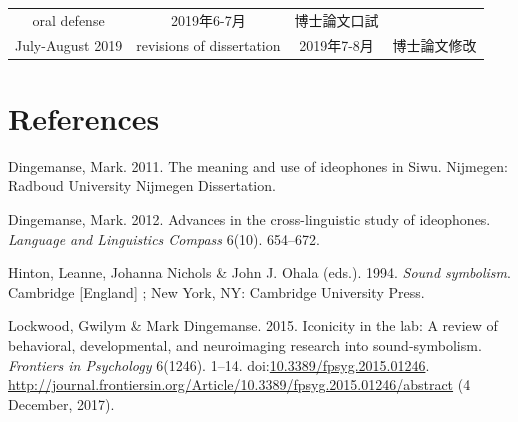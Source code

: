 \documentclass[12pt,]{article}
\theoremstyle{definition}
\theoremstyle{definition}
\theoremstyle{definition}
\theoremstyle{remark}
\begin{document}
\begin{longtable}[]{@{}cccc@{}}
\begin{minipage}[t]{0.26\columnwidth}
oral defense\strut
\end{minipage} & \begin{minipage}[t]{0.18\columnwidth}\centering\strut
2019年6-7月\strut
\end{minipage} & \begin{minipage}[t]{0.24\columnwidth}\centering\strut
博士論文口試\strut
\end{minipage}\tabularnewline
\begin{minipage}[t]{0.20\columnwidth}\centering\strut
July-August 2019\strut
\end{minipage} & \begin{minipage}[t]{0.26\columnwidth}\centering\strut
revisions of dissertation\strut
\end{minipage} & \begin{minipage}[t]{0.18\columnwidth}\centering\strut
2019年7-8月\strut
\end{minipage} & \begin{minipage}[t]{0.24\columnwidth}\centering\strut
博士論文修改\strut
\end{minipage}\tabularnewline
\bottomrule
\end{longtable}

\section{References}\label{references}

\setlength{\parindent}{-0.5in} \setlength{\leftskip}{0.5in}
\setlength{\parskip}{8pt} \noindent

\hypertarget{refs}{}
\hypertarget{ref-Dingemanse2011a}{}
Dingemanse, Mark. 2011. The meaning and use of ideophones in Siwu.
Nijmegen: Radboud University Nijmegen Dissertation.

\hypertarget{ref-Dingemanse2012}{}
Dingemanse, Mark. 2012. Advances in the cross-linguistic study of
ideophones. \emph{Language and Linguistics Compass} 6(10). 654--672.

\hypertarget{ref-Hinton1994}{}
Hinton, Leanne, Johanna Nichols \& John J. Ohala (eds.). 1994.
\emph{Sound symbolism}. Cambridge {[}England{]} ; New York, NY:
Cambridge University Press.

\hypertarget{ref-Lockwood2015a}{}
Lockwood, Gwilym \& Mark Dingemanse. 2015. Iconicity in the lab: A
review of behavioral, developmental, and neuroimaging research into
sound-symbolism. \emph{Frontiers in Psychology} 6(1246). 1--14.
doi:\href{https://doi.org/10.3389/fpsyg.2015.01246}{10.3389/fpsyg.2015.01246}.
\url{http://journal.frontiersin.org/Article/10.3389/fpsyg.2015.01246/abstract}
(4 December, 2017).
\end{document}
